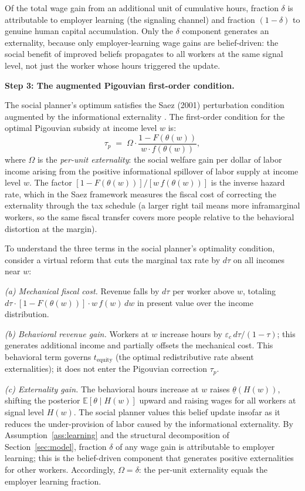 \documentclass[12pt]{article}
\theoremstyle{definition}
\theoremstyle{remark}
\begin{document}
Of the total wage gain from an additional unit of cumulative hours, fraction $\delta$ is
attributable to employer learning (the signaling channel) and fraction $(1-\delta)$ to genuine
human capital accumulation. Only the $\delta$ component generates an externality, because only
employer-learning wage gains are belief-driven: the social benefit of improved beliefs propagates
to all workers at the same signal level, not just the worker whose hours triggered the update.

\medskip
\noindent \textbf{Step 3: The augmented Pigouvian first-order condition.}

The social planner's optimum satisfies the Saez (2001) perturbation condition augmented by
the informational externality \citep{saez2001using, sztutman2024}. The first-order condition
for the optimal Pigouvian subsidy at income level $w$ is:
\begin{equation}
\label{eq:pigouvian_intermediate}
\tau_p \;=\; \Omega \cdot \frac{1 - F(\theta(w))}{w \cdot f(\theta(w))},
\end{equation}
where $\Omega$ is the \emph{per-unit externality}: the social welfare gain per dollar of labor
income arising from the positive informational spillover of labor supply at income level $w$.
The factor $[1-F(\theta(w))]/[w\,f(\theta(w))]$ is the inverse hazard rate, which in the
Saez framework measures the fiscal cost of correcting the externality through the tax schedule
(a larger right tail means more inframarginal workers, so the same fiscal transfer covers more
people relative to the behavioral distortion at the margin).

To understand the three terms in the social planner's optimality condition, consider a virtual
reform that cuts the marginal tax rate by $d\tau$ on all incomes near $w$:

\emph{(a) Mechanical fiscal cost.} Revenue falls by $d\tau$ per worker above $w$, totaling
$d\tau\cdot[1-F(\theta(w))]\cdot w\,f(w)\,dw$ in present value over the income distribution.

\emph{(b) Behavioral revenue gain.} Workers at $w$ increase hours by
$\varepsilon_c\,d\tau/(1-\tau)$; this generates additional income and partially offsets the
mechanical cost. This behavioral term governs $t_{\text{equity}}$ (the optimal redistributive
rate absent externalities); it does not enter the Pigouvian correction $\tau_p$.

\emph{(c) Externality gain.} The behavioral hours increase at $w$ raises $\underline{\theta}(H(w))$,
shifting the posterior $\mathbb{E}[\theta \mid H(w)]$ upward and raising wages for all workers at
signal level $H(w)$. The social planner values this belief update insofar as it reduces the
under-provision of labor caused by the informational externality. By
Assumption~\ref{ass:learning} and the structural decomposition of
Section~\ref{sec:model}, fraction $\delta$ of any wage gain is attributable to employer
learning; this is the belief-driven component that generates positive externalities for other
workers. Accordingly, $\Omega = \delta$: the per-unit externality equals the employer learning
fraction.
\end{document}
